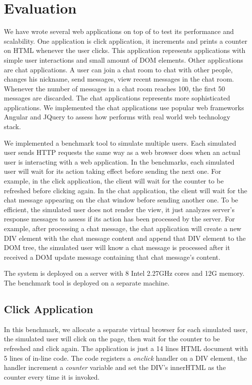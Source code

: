 \section{Evaluation}
\label{sec:eval}
We have wrote several web applications on top of \cb{} to test its
performance and scalability.
One application is click application,
it increments and prints a counter on HTML whenever the user clicks.
This application represents applications with simple user interactions and small amount of DOM elements.
Other applications are chat applications.
A user can join a chat room to chat with other people,
changes his nickname, send messages, view recent messages in the chat room.
Whenever the number of messages in a chat room reaches 100, the first 50 messages
are discarded.
The chat applications represents more sophisticated applications.
We implemented the chat applications use popular web frameworks Angular and JQuery
to assess how \cb{} performs with real world web technology stack.

\chatroomfig{}

We implemented a benchmark tool to simulate multiple users.
Each simulated user sends HTTP requests the same way as
a web browser does when an actual user is interacting with a web application.
In the benchmarks, each simulated user will wait for its action taking effect before 
sending the next one.
For example, in the click application, the client will wait for the counter
to be refreshed before clicking again.
In the chat application, the client will wait for
the chat message appearing on the chat window before sending another one.
To be efficient, the simulated user does not render the view, 
it just analyzes server's response messages to assess 
if its action has been processed by the server.
For example, after processing a chat message, 
the chat application will create a new DIV element with the chat message content
and append that DIV element to the DOM tree, 
the simulated user will know a chat message is processed after it received
a DOM update message containing that chat message's content.

The \cb{} system is deployed on a server with 8 Intel 2.27GHz cores and 12G memory.
The benchmark tool is deployed on a separate machine.

\subsection{Click Application}
In this benchmark,
we allocate a separate virtual browser for each simulated user,
the simulated user will click on the page, 
then wait for the counter to be refreshed and click again.
The application is just a 14 lines HTML document with 5 lines of in-line
\js{} code.
The \js{} code registers a \emph{onclick} handler on a DIV element,
the handler increment a \emph{counter} variable and set the DIV's innerHTML as
the counter every time it is invoked.

